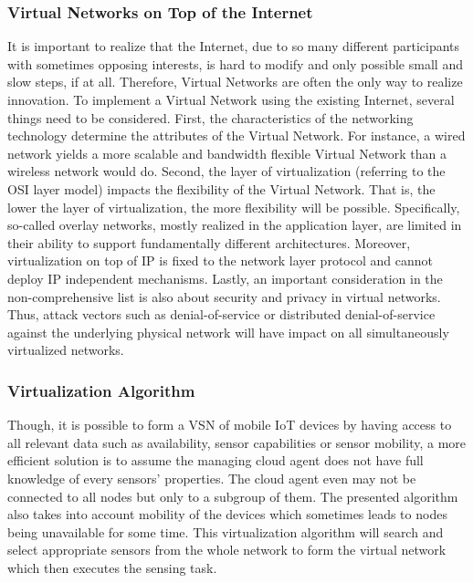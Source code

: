 \documentclass[12pt,journal]{IEEEtran}
\begin{document}
\subsubsection{Virtual Networks on Top of the Internet}
It is important to realize that the Internet, due to so many different participants with sometimes opposing interests, is hard to modify and only possible small and slow steps, if at all. Therefore, Virtual Networks are often the only way to realize innovation. To implement a Virtual Network using the existing Internet, several things need to be considered. First, the characteristics of the networking technology determine the attributes of the Virtual Network. For instance, a wired network yields a more scalable and bandwidth flexible Virtual Network than a wireless network would do. \cite{Chowdhury} Second, the layer of virtualization (referring to the OSI layer model) impacts the flexibility of the Virtual Network. That is, the lower the layer of virtualization, the more flexibility will be possible. Specifically, so-called overlay networks, mostly realized in the application layer, are limited in their ability to support fundamentally different architectures. \cite{Chowdhury} Moreover, virtualization on top of IP is fixed to the network layer protocol and cannot deploy IP independent mechanisms.  \cite{Chowdhury} Lastly, an important consideration in the non-comprehensive list is also about security and privacy in virtual networks. Thus, attack vectors such as denial-of-service or distributed denial-of-service against the underlying physical network will have impact on all simultaneously virtualized networks.
\subsubsection{Virtualization Algorithm}
Though, it is possible to form a VSN of mobile IoT devices by having access to all relevant data such as availability, sensor capabilities or sensor mobility, a more efficient solution is to assume the managing cloud agent does not have full knowledge of every sensors’ properties. \cite{Sherif} The cloud agent even may not be connected to all nodes but only to a subgroup of them. The presented algorithm also takes into account mobility of the devices which sometimes leads to nodes being unavailable for some time. \cite{Sherif}
This virtualization algorithm will search and select appropriate sensors from the whole network to form the virtual network which then executes the sensing task.
\end{document}
